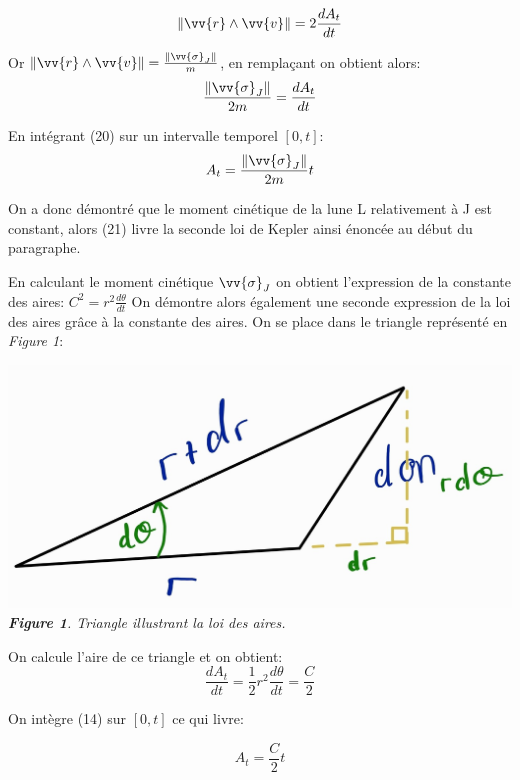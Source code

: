 \documentclass{aa}
\begin{document}
    \begin{equation}
       \| \vv{r} \wedge \vv{v} \| = 2 \frac{dA_t}{dt}
    \end{equation}

\begin{flushleft}
    Or $\| \vv{r} \wedge \vv{v} \| =  \frac{\|\vv{\sigma}_J\| }{m}$, en remplaçant on obtient alors:
    \begin{equation}
        \frac{\|\vv{\sigma}_J\| }{2m}=  \frac{dA_t}{dt}
    \end{equation}

    En intégrant (20) sur un intervalle temporel $[0,t]$:
    \begin{equation}
         A_t = \frac{\|\vv{\sigma}_J\| }{2m}t
    \end{equation}
\end{flushleft}

    On a donc démontré que le moment cinétique de la lune L relativement à J est constant, alors (21) livre la seconde loi de Kepler ainsi énoncée au début du paragraphe.\break

    En calculant le moment cinétique $\vv{\sigma}_J$ on obtient l'expression de la constante des aires: $C^2 = r^2\frac{d\theta}{dt}$  \break
    On démontre alors également une seconde expression de la loi des aires grâce à la constante des aires. On se place dans le triangle représenté en \emph{Figure 1}: 

    \begin{center}
        \includegraphics[scale = 0.20]{images/triangle.jpg}
        \emph{\textbf{Figure 1}. Triangle illustrant la loi des aires.}
    \end{center}
    
\begin{flushleft}
    On calcule l'aire de ce triangle et on obtient:
    \begin{equation}
        \frac{dA_t}{dt} = \frac{1}{2} r^2 \frac{d\theta}{dt} = \frac{C}{2}
    \end{equation}

    On intègre (14) sur $[0,t]$ ce qui livre:

    \begin{equation}
        A_t = \frac{C}{2}t
    \end{equation}
\end{flushleft}        
\end{document}
